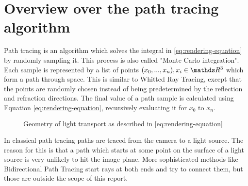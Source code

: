 \documentclass{ACGSeminar}
\begin{document}
\section{Overview over the path tracing algorithm} \label{path-tracing}
Path tracing is an algorithm which solves the integral in \eqref{eq:rendering-equation} by randomly sampling it. This process is also called "Monte Carlo integration". \cite{veach1997robust} Each sample is represented by a list of points $(x_0, ..., x_n), x_i \in \R^3$ which form a path through space. This is similar to Whitted Ray Tracing, except that the points are randomly chosen instead of being predetermined by the reflection and refraction directions. The final value of a path sample is calculated using Equation \eqref{eq:rendering-equation}, recursively evaluating it for $x_0$ to $x_n$. 

\begin{figure}[htb!]
  \begin{centering}
    \par
  \end{centering}
  \caption{Geometry of light transport as described in \eqref{eq:rendering-equation}}
  \label{fig:light-transport}
\end{figure}


In classical path tracing paths are traced from the camera to a light source. The reason for this is that a path which starts at some point on the surface of a light source is very unlikely to hit the image plane. More sophisticated methods like Bidirectional Path Tracing start rays at both ends and try to connect them, but those are outside the scope of this report.
\end{document}
